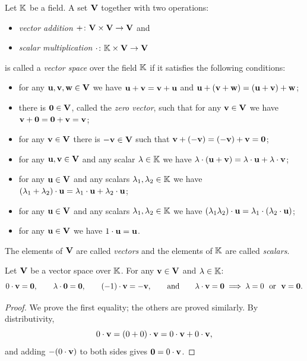 \begin{definition}
Let $\mathbb{K}$ be a field. A set $\mathbf{V}$ together with two operations:
\begin{itemize}
\item \emph{vector addition} $+\colon \mathbf{V}\times \mathbf{V}\to \mathbf{V}$ and
\item \emph{scalar multiplication} $\cdot\colon \mathbb{K}\times \mathbf{V}\to \mathbf{V}$
\end{itemize}
is called a \emph{vector space} over the field $\mathbb{K}$ if it satisfies the following conditions:
\begin{itemize}
\item for any $\mathbf{u},\mathbf{v},\mathbf{w}\in \mathbf{V}$ we have $\mathbf{u}+\mathbf{v}=\mathbf{v}+\mathbf{u}$ and $\mathbf{u}+(\mathbf{v}+\mathbf{w}) = (\mathbf{u}+\mathbf{v})+\mathbf{w}$;
\item there is $\mathbf{0}\in \mathbf{V}$, called the \emph{zero vector}, such that for any $\mathbf{v}\in\mathbf{V}$ we have
$\mathbf{v}+\mathbf{0} =\mathbf{0}+\mathbf{v}=\mathbf{v}$;
\item for any $\mathbf{v}\in\mathbf{V}$ there is $-\mathbf{v}\in\mathbf{V}$ such that $\mathbf{v}+(-\mathbf{v}) = (-\mathbf{v})+\mathbf{v} = \mathbf{0}$;
\item for any $\mathbf{u},\mathbf{v}\in \mathbf{V}$ and any scalar $\lambda\in \mathbb{K}$ we have
$\lambda\cdot(\mathbf{u}+\mathbf{v})=\lambda\cdot \mathbf{u} + \lambda\cdot\mathbf{v}$;
\item for any $\mathbf{u}\in \mathbf{V}$ and any scalars $\lambda_1,\lambda_2\in \mathbb{K}$ we have
$(\lambda_1+\lambda_2)\cdot\mathbf{u}=\lambda_1\cdot \mathbf{u} + \lambda_2\cdot\mathbf{u}$;
\item for any $\mathbf{u}\in \mathbf{V}$ and any scalars $\lambda_1,\lambda_2\in \mathbb{K}$ we have
$(\lambda_1 \lambda_2)\cdot\mathbf{u}=\lambda_1\cdot (\lambda_2\cdot\mathbf{u})$;
\item for any $\mathbf{u}\in \mathbf{V}$ we have $1\cdot \mathbf{u}=\mathbf{u}$.
\end{itemize}
The elements of $\mathbf{V}$ are called \emph{vectors} and the elements of $\mathbb{K}$ are called \emph{scalars}.
\end{definition}

\begin{fact}
Let $\mathbf{V}$ be a vector space over $\mathbb{K}$. For any $\mathbf{v}\in\mathbf{V}$ and $\lambda\in\mathbb{K}$:
\[
0\cdot \vv = \0, \qquad \lambda\cdot \0 = \0, \qquad (-1)\cdot \vv = -\vv,
\qquad \text{and} \qquad \lambda\cdot\vv = \0 \implies \lambda = 0 \ \text{ or } \ \vv = \0.
\]
\end{fact}

\begin{proof}
We prove the first equality; the others are proved similarly. By distributivity,
\[
0\cdot \mathbf{v} = (0+0)\cdot \mathbf{v} = 0\cdot\mathbf{v} + 0\cdot \mathbf{v},
\]
and adding $-(0\cdot\mathbf{v})$ to both sides gives $\mathbf{0} = 0\cdot\mathbf{v}$.
\end{proof}


